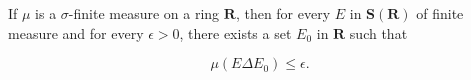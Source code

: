 If $\mu$ is a $\sigma$-finite measure on a ring $\mathbf{R}$, then for every $E$ in $\mathbf{S}(\mathbf{R})$ of finite measure and for every $\epsilon > 0$, there exists a set $E_0$ in $\mathbf{R}$ such that

$$\mu(E \Delta E_0) \leq \epsilon.$$
